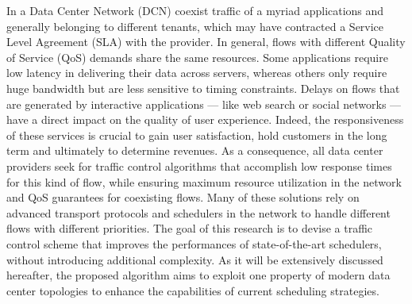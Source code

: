 In a Data Center Network (DCN) coexist traffic of a myriad applications and generally belonging to different tenants, which may have contracted a Service Level Agreement (SLA) with the provider. In general, flows with different Quality of Service (QoS) demands share the same resources. Some applications require low latency in delivering their data across servers, whereas others only require huge bandwidth but are less sensitive to timing constraints. Delays on flows that are generated by interactive applications --- like web search or social networks --- have a direct impact on the quality of user experience. Indeed, the responsiveness of these services is crucial to gain user satisfaction, hold customers in the long term and ultimately to determine revenues. As a consequence, all data center providers seek for traffic control algorithms that accomplish low response times for this kind of flow, while ensuring maximum resource utilization in the network and QoS guarantees for coexisting flows. Many of these solutions rely on advanced transport protocols and schedulers in the network to handle different flows with different priorities. The goal of this research is to devise a traffic control scheme that improves the performances of state-of-the-art schedulers, without introducing additional complexity. As it will be extensively discussed hereafter, the proposed algorithm aims to exploit one property of modern data center topologies to enhance the capabilities of current scheduling strategies. 

